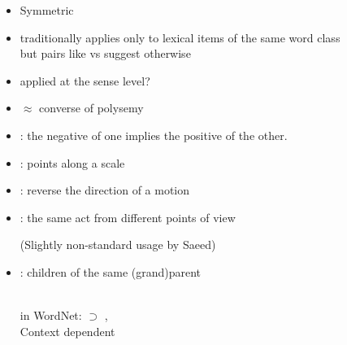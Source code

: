 \documentclass[a4paper,landscape,headrule,footrule,xetex]{foils}
\begin{document}

  \begin{itemize}
  \item Symmetric
  \item traditionally applies only to lexical items of the same word class
    \\ but pairs like  vs  suggest otherwise
  \item applied at the sense level?
  \item $\approx$ converse of polysemy
  \end{itemize}





\begin{itemize}
\item {}: the negative of one implies the positive of the other.
  \begin{exe}
    \ex {}
    \ex {}
  \end{exe}
\item {}: points  along a scale
  \begin{exe}
    \ex {}
    \ex {}
  \end{exe}
\item {}: reverse the direction of a motion
  \begin{exe}
    \ex {}
    \ex {}
  \end{exe}
\newpage
\item {}: the same act from different points of view
  \begin{exe}
    \ex {}
    \ex {}
  \end{exe}
  (Slightly non-standard usage by Saeed)
\item {}: children of the same (grand)parent
  \begin{exe}
    \ex {}
    \\ \textnormal{in WordNet:}  $\supset$ , 
    \ex {}
    \\  \textnormal{Context dependent}
  \end{exe}
\end{itemize}
\end{document}
